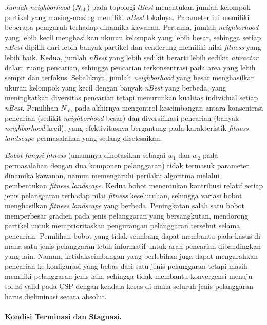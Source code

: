 \textit{Jumlah neighborhood} ($N_{\text{nh}}$) pada topologi \textit{lBest} menentukan jumlah kelompok partikel yang masing-masing memiliki \textit{nBest} lokalnya. Parameter ini memiliki beberapa pemgaruh terhadap dinamika kawanan. Pertama, jumlah \textit{neighborhood} yang lebih kecil menghasilkan ukuran kelompok yang lebih besar, sehingga setiap \textit{nBest} dipilih dari lebih banyak partikel dan cenderung memiliki nilai \textit{fitness} yang lebih baik. Kedua, jumlah \textit{nBest} yang lebih sedikit berarti lebih sedikit \textit{attractor} dalam ruang pencarian, sehingga pencarian terkonsentrasi pada area yang lebih sempit dan terfokus. Sebaliknya, jumlah \textit{neighborhood} yang besar menghasilkan ukuran kelompok yang kecil dengan banyak \textit{nBest} yang berbeda, yang meningkatkan diversitas pencarian tetapi menurunkan kualitas individual setiap \textit{nBest}. Pemilihan $N_{\text{nh}}$ pada akhirnya mengontrol keseimbangan antara konsentrasi pencarian (sedikit \textit{neighborhood} besar) dan diversifikasi pencarian (banyak \textit{neighborhood} kecil), yang efektivitasnya bergantung pada karakteristik \textit{fitness landscape} permasalahan yang sedang diselesaikan.

\textit{Bobot fungsi fitness} (umumnya dinotasikan sebagai $w_1$ dan $w_2$ pada permasalahan dengan dua komponen pelanggaran) tidak termasuk parameter dinamika kawanan, namun memengaruhi perilaku algoritma melalui pembentukan \textit{fitness landscape}. Kedua bobot menentukan kontribusi relatif setiap jenis pelanggaran terhadap nilai \textit{fitness} keseluruhan, sehingga variasi bobot menghasilkan \textit{fitness landscape} yang berbeda. Peningkatan salah satu bobot memperbesar gradien pada jenis pelanggaran yang bersangkutan, mendorong partikel untuk memprioritaskan pengurangan pelanggaran tersebut selama pencarian. Pemilihan bobot yang tidak seimbang dapat membantu pada kasus di mana satu jenis pelanggaran lebih informatif untuk arah pencarian dibandingkan yang lain. Namun, ketidakseimbangan yang berlebihan juga dapat mengarahkan pencarian ke konfigurasi yang bebas dari satu jenis pelanggaran tetapi masih memiliki pelanggaran jenis lain, sehingga tidak membantu konvergensi menuju solusi valid pada CSP dengan kendala keras di mana seluruh jenis pelanggaran harus dieliminasi secara absolut.

\paragraph{Kondisi Terminasi dan Stagnasi.}
\label{subsec:stagnasi-terminasi}

